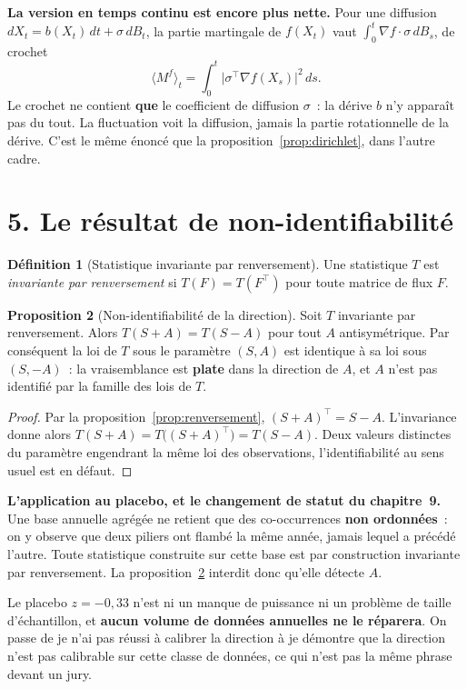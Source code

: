 \documentclass[11pt,a4paper]{article}
\theoremstyle{definition}
\newtheorem{proposition}{Proposition}
\newtheorem{definition}[proposition]{Définition}
\newcommand{\T}{^{\top}}
\begin{document}
\medskip
\noindent\textbf{La version en temps continu est encore plus nette.} Pour une diffusion
$dX_t=b(X_t)\,dt+\sigma\,dB_t$, la partie martingale de $f(X_t)$ vaut
$\int_0^t\nabla f\cdot\sigma\,dB_s$, de crochet
\begin{equation}
  \bigl\langle M^f\bigr\rangle_t=\int_0^t\bigl|\sigma\T\nabla f(X_s)\bigr|^2\,ds .
  \label{eq:crochet-diffusion}
\end{equation}
Le crochet ne contient \textbf{que} le coefficient de diffusion $\sigma$~: la dérive $b$
n'y apparaît pas du tout. La fluctuation voit la diffusion, jamais la partie rotationnelle
de la dérive. C'est le même énoncé que la proposition~\ref{prop:dirichlet}, dans l'autre
cadre.

\section*{5. Le résultat de non-identifiabilité}

\begin{definition}[Statistique invariante par renversement]\label{def:invariante}
Une statistique $T$ est \emph{invariante par renversement} si $T(F)=T(F\T)$ pour toute
matrice de flux $F$.
\end{definition}

\begin{proposition}[Non-identifiabilité de la direction]\label{prop:nonid}
Soit $T$ invariante par renversement. Alors $T(S+A)=T(S-A)$ pour tout $A$ antisymétrique.
Par conséquent la loi de $T$ sous le paramètre $(S,A)$ est identique à sa loi sous
$(S,-A)$~: la vraisemblance est \textbf{plate} dans la direction de $A$, et $A$ n'est pas
identifié par la famille des lois de $T$.
\end{proposition}

\begin{proof}
Par la proposition~\ref{prop:renversement}, $(S+A)\T=S-A$. L'invariance donne alors
$T(S+A)=T\bigl((S+A)\T\bigr)=T(S-A)$. Deux valeurs distinctes du paramètre engendrant la
même loi des observations, l'identifiabilité au sens usuel est en défaut.
\end{proof}

\begin{cle}[colback=orange!8,colframe=orange!70!black]
\textbf{L'application au placebo, et le changement de statut du chapitre~9.} Une base
annuelle agrégée ne retient que des co-occurrences \textbf{non ordonnées}~: on y observe
que deux piliers ont flambé la même année, jamais lequel a précédé l'autre. Toute
statistique construite sur cette base est par construction invariante par renversement.
La proposition~\ref{prop:nonid} interdit donc qu'elle détecte $A$.

Le placebo $z=-0{,}33$ n'est ni un manque de puissance ni un problème de taille
d'échantillon, et \textbf{aucun volume de données annuelles ne le réparera}. On passe de
\og je n'ai pas réussi à calibrer la direction\fg{} à \og je démontre que la direction
n'est pas calibrable sur cette classe de données\fg{}, ce qui n'est pas la même phrase
devant un jury.
\end{cle}
\end{document}
